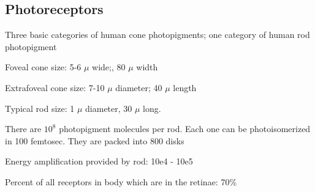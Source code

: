 \subsection*{Photoreceptors}

\be

\item Three basic categories of human cone photopigments;
one category of human rod photopigment


\item Foveal cone size: 5-6 $\mu$ wide;, 80 $\mu$ width

\item Extrafoveal cone size: 7-10 $\mu$ diameter; 40 $\mu$ length

\item Typical rod size: 1 $\mu$ diameter, 30 $\mu$ long.

\item There are $10^8$ photopigment molecules per rod. Each one can be
photoisomerized in 100 femtosec.  They are packed into 800 disks

\item Energy amplification provided by rod: 10e4 - 10e5

\item Percent of all receptors in body which are in the retinae: 70\%

\ee

